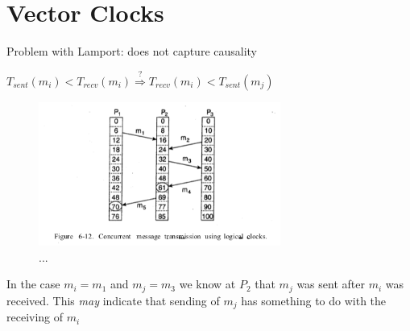 \documentclass[ngerman,a4paper]{report}
\begin{document}
\section{Vector Clocks}
\begin{compactitem}
	\item Problem with Lamport: does not capture causality
	\item $T_{sent}(m_i) < T_{recv} (m_i) \overset{?}{\Rightarrow} T_{recv} (m_i) < T_{sent} (m_j)$ 
	

\begin{figure}[h]
	\centering
	\includegraphics[width=300px]{gfx/lamport-concurrent.png}
	\caption{...}
	\label{img:lamport-concurrent}
\end{figure}

	\item 
		In the case $m_i=m_1$ and $m_j = m_3$ we know at $P_2$  that $m_j$ was sent after $m_i$ was received. This \emph{may} indicate that sending of $m_j$ has something to do with the receiving of $m_i$ 


\end{compactitem}
\end{document}
